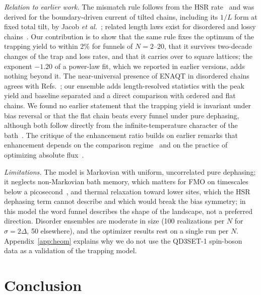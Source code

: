 \documentclass[aps,pre,preprint,floatfix]{revtex4-2}
\begin{document}
\textit{Relation to earlier work.}
The mismatch rule follows from the HSR rate~\cite{haken1973,moix2013} and
was derived for the boundary-driven current of tilted chains, including its
$1/L$ form at fixed total tilt, by Jacob \textit{et al.}~\cite{jacob2024};
related length laws exist for disordered and lossy
chains~\cite{zhang2017,coates2021,skalkin2025}.
Our contribution is to show that the same rule fixes the optimum of the
trapping yield to within $2\%$ for funnels of $N=2$--$20$, that it survives
two-decade changes of the trap and loss rates, and that it carries over to
square lattices; the exponent $-1.20$ of a power-law fit, which we reported
in earlier versions, adds nothing beyond it.
The near-universal presence of ENAQT in disordered chains agrees with
Refs.~\cite{moix2013,novo2016,zhang2017,zerahharush2020,coates2021}; our
ensemble adds length-resolved statistics with the peak yield and baseline
separated and a direct comparison with ordered and flat chains.
We found no earlier statement that the trapping yield is invariant under bias
reversal or that the flat chain beats every funnel under pure dephasing,
although both follow directly from the infinite-temperature character of the
bath~\cite{moix2013,jacob2024}.
The critique of the enhancement ratio builds on earlier remarks that
enhancement depends on the comparison regime~\cite{kassal2013} and on the
practice of optimizing absolute flux~\cite{coates2021,lawrence2026}.

\textit{Limitations.}
The model is Markovian with uniform, uncorrelated pure dephasing; it neglects
non-Markovian bath memory, which matters for FMO on timescales below a
picosecond~\cite{ishizaki2009,moix2011}, and thermal relaxation toward lower
sites, which the HSR dephasing term cannot describe and which would break the
bias symmetry; in this model the word funnel describes the shape of the
landscape, not a preferred direction.
Disorder ensembles are moderate in size (100 realizations per $N$ for
$\sigma=2\Delta$, 50 elsewhere), and the optimizer results rest on a single
run per $N$.
Appendix~\ref{app:heom} explains why we do not use the QD3SET-1 spin-boson data
as a validation of the trapping model.

\section{\label{sec:conclusion}Conclusion}
\end{document}
